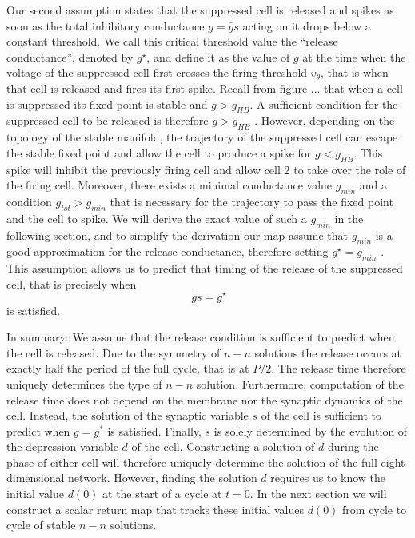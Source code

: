 Our second assumption states that the suppressed cell is released and spikes as soon as the total inhibitory conductance $g = \bar g s$ acting on it drops below a constant threshold.
We call this critical threshold value the ``release conductance'', denoted by $g^\star$, and define it as the value of $g$ at the time when the voltage of the suppressed cell first crosses the firing threshold $v_{\theta}$, that is when that cell is released and fires its first spike.
Recall from figure ... that when a cell is suppressed its fixed point is stable and $g > g_{HB}$.
A sufficient condition for the suppressed cell to be released is therefore $g > g_{HB}$ .
However, depending on the topology of the stable manifold, the trajectory of the suppressed cell can escape the stable fixed point and allow the cell to produce a spike for $g < g_{HB}$.
This spike will inhibit the previously firing cell and allow cell 2 to take over the role of the firing cell.
Moreover, there exists a minimal conductance value $g_{min}$ and a condition $g_{tot} > g_{min}$ that is necessary for the trajectory to pass the fixed point and the cell to spike.
We will derive the exact value of such a $g_{min}$ in the following section, and to simplify the derivation our map assume that $g_{min}$ is a good approximation for the release conductance, therefore setting $g^\star = g_{min}$ .
This assumption allows us to predict that timing of the release of the suppressed cell, that is precisely when
\begin{equation}
	~\label{eq:release}
	\bar g s=g^{\star}
\end{equation}
is satisfied.

In summary: We assume that the release condition is sufficient to predict when the \suppressed{} cell is released.
Due to the symmetry of $n-n$ solutions the release occurs at exactly half the period of the full cycle, that is at $P/2$.
The release time therefore uniquely determines the type of $n-n$ solution.
Furthermore, computation of the release time does not depend on the membrane nor the synaptic dynamics of the \suppressed{} cell.
Instead, the solution of the synaptic variable $s$ of the \free{} cell is sufficient to predict when $g=g^{*}$ is satisfied.
Finally, $s$ is solely determined by the evolution of the depression variable $d$ of the \free{} cell.
Constructing a solution of $d$ during the \free{} phase of either cell will therefore uniquely determine the solution of the full eight-dimensional network.
However, finding the solution $d$ requires us to know the initial value $d(0)$ at the start of a cycle at $t=0$.
In the next section we will construct a scalar return map that tracks these initial values $d(0)$ from cycle to cycle of stable $n-n$ solutions.

